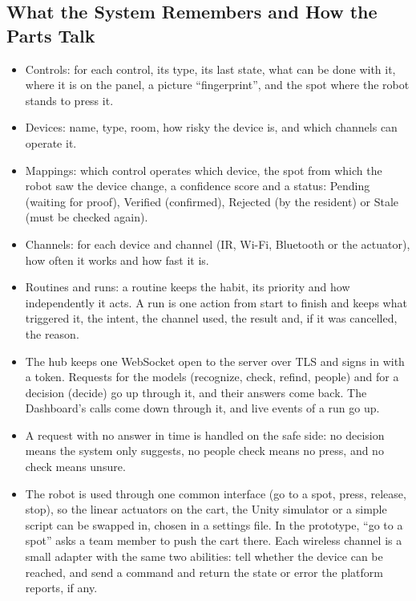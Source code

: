 \documentclass[conference]{IEEEtran}
\begin{document}
\subsection{What the System Remembers and How the Parts Talk}
\begin{itemize}
\item Controls: for each control, its type, its last state, what can be done with it, where it is on the panel, a picture ``fingerprint'', and the spot where the robot stands to press it.
\item Devices: name, type, room, how risky the device is, and which channels can operate it.
\item Mappings: which control operates which device, the spot from which the robot saw the device change, a confidence score and a status: Pending (waiting for proof), Verified (confirmed), Rejected (by the resident) or Stale (must be checked again).
\item Channels: for each device and channel (IR, Wi-Fi, Bluetooth or the actuator), how often it works and how fast it is.
\item Routines and runs: a routine keeps the habit, its priority and how independently it acts. A run is one action from start to finish and keeps what triggered it, the intent, the channel used, the result and, if it was cancelled, the reason.
\item The hub keeps one WebSocket open to the server over TLS and signs in with a token. Requests for the models (recognize, check, refind, people) and for a decision (decide) go up through it, and their answers come back. The Dashboard's calls come down through it, and live events of a run go up.
\item A request with no answer in time is handled on the safe side: no decision means the system only suggests, no people check means no press, and no check means unsure.
\item The robot is used through one common interface (go to a spot, press, release, stop), so the linear actuators on the cart, the Unity simulator or a simple script can be swapped in, chosen in a settings file. In the prototype, ``go to a spot'' asks a team member to push the cart there. Each wireless channel is a small adapter with the same two abilities: tell whether the device can be reached, and send a command and return the state or error the platform reports, if any.
\end{itemize}
\end{document}
